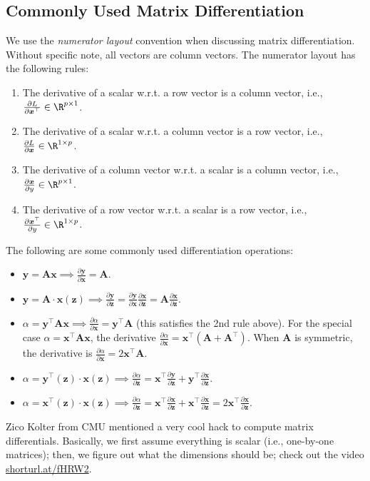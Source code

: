 \subsection{Commonly Used Matrix Differentiation}
    We use the \emph{numerator layout} convention when discussing matrix differentiation.
    Without specific note, all vectors are column vectors.
    The numerator layout has the following rules:
        \begin{enumerate}
            \item The derivative of a scalar w.r.t. a row vector is a column vector, i.e., $\frac{\partial L}{\partial \bm{x}^\top} \in \R^{\nfeat \times 1}$.
            \item The derivative of a scalar w.r.t. a column vector is a row vector, i.e., $\frac{\partial L}{\partial \bm{x} } \in \R^{1 \times \nfeat}$.
            \item The derivative of a column vector w.r.t. a scalar is a column vector, i.e., $\frac{\partial \bm{x}}{\partial y } \in \R^{ \nfeat \times 1}$.
            \item The derivative of a row vector w.r.t. a scalar is a row vector, i.e., $\frac{\partial \bm{x}^\top }{\partial y } \in \R^{ 1 \times \nfeat}$.
        \end{enumerate}
    The following are some commonly used differentiation operations:
        \begin{itemize}
            \item $\bm{y} = \bm{A} \bm{x} \implies \frac{\partial \bm{y}}{\partial \bm{x}} = \bm{A}$.
            \item $\bm{y} = \bm{A} \cdot  \bm{x}(\bm{z}) \implies \frac{\partial \bm{y}}{\partial \bm{z}} = \frac{\partial \bm{y}}{\partial \bm{x}} \frac{\partial \bm{x}}{\partial \bm{z}} = \bm{A} \frac{\partial \bm{x}}{\partial \bm{z}}$.
            \item $\alpha = \bm{y}^\top \bm{A} \bm{x} \implies \frac{\partial \alpha}{\partial \bm{x}} = \bm{y}^\top \bm{A}$ (this satisfies the 2nd rule above). For the special case $\alpha = \bm{x}^\top \bm{A} \bm{x}$, the derivative $\frac{\partial \alpha}{\partial \bm{x}} = \bm{x}^\top (\bm{A} + \bm{A}^\top)$. When $\bm{A}$ is symmetric, the derivative is $\frac{\partial \alpha}{\partial \bm{x}} = 2\bm{x}^\top \bm{A}$.
            \item $\alpha = \bm{y}^\top(\bm{z}) \cdot \bm{x}(\bm{z}) \implies \frac{\partial \alpha}{\partial \bm{z}} = \bm{x}^\top \frac{\partial \bm{y}}{\partial \bm{z}} + \bm{y}^\top \frac{\partial \bm{x}}{\partial \bm{z}}$.
            \item $\alpha = \bm{x}^\top(\bm{z}) \cdot \bm{x}(\bm{z}) \implies \frac{\partial \alpha}{\partial \bm{z}} = \bm{x}^\top \frac{\partial \bm{x}}{\partial \bm{z}} + \bm{x}^\top \frac{\partial \bm{x}}{\partial \bm{z}} = 2\bm{x}^\top \frac{\partial \bm{x}}{\partial \bm{z}}$.
        \end{itemize}
        Zico Kolter from CMU mentioned a very cool hack to compute matrix differentials. 
        Basically, we first assume everything is scalar (i.e., one-by-one matrices); then, we figure out what the dimensions should be; check out the video \url{shorturl.at/fHRW2}.
        
